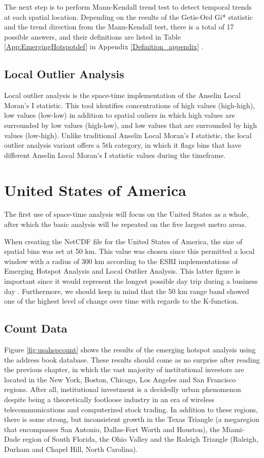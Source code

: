 The next step is to perform Mann-Kendall trend test to detect temporal trends at each spatial location. Depending on the results of the Getis-Ord Gi* statistic and the trend direction from the Mann-Kendall test, there is a total of 17 possible answers, and their definitions are listed in Table \ref{App:EmergingHotspotdef} in Appendix \ref{Definition_appendix} \citep{Esri}.

\subsection{Local Outlier Analysis}

Local outlier analysis is the space-time implementation of the Anselin Local Moran's I statistic.  This tool identifies concentrations of high values (high-high), low values (low-low) in addition to spatial ouliers in which high values are surrounded by low values (high-low), and low values that are surrounded by high values (low-high).  Unlike traditional Anselin Local Moran's I statistic, the local outlier analysis variant offers a 5th category, in which it flags bins that have different Anselin Local Moran's I statistic values during the timeframe.  

\section{United States of America}

The first use of space-time analysis will focus on the United States as a whole, after which the basic analysis will be repeated on the five largest metro areas. 

When creating the NetCDF file for the United States of America, the size of spatial bins was set at 50 km.  This value was chosen since this permitted a local window with a radius of 300 km according to the ESRI implementations of Emerging Hotspot Analysis and Local Outlier Analysis.  This latter figure is important since it would represent the longest possible day trip during a business day \citep{Fritsch06}.  Furthermore, we should keep in mind that the 50 km range band showed one of the highest level of change over time with regards to the K-function.  

\subsection{Count Data}

Figure \ref{fig:usahspcount} shows the results of the emerging hotspot analysis using the address book database. These results should come as no surprise after reading the previous chapter, in which the vast majority of institutional investors are located in the New York, Boston, Chicago, Los Angeles and San Francisco regions.  After all, institutional investment is a decidedly urban phenomenon despite being a theoretically footloose industry in an era of wireless telecommunications and computerized stock trading.  In addition to these regions, there is some strong, but inconsistent growth in the Texas Triangle (a megaregion that encompasses San Antonio, Dallas-Fort Worth and Houston), the Miami-Dade region of South Florida, the Ohio Valley and the Raleigh Triangle (Raleigh, Durham and Chapel Hill, North Carolina).  


